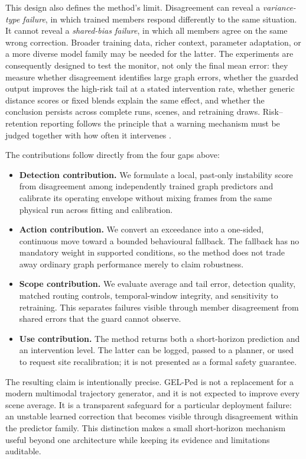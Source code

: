 This design also defines the method's limit. Disagreement can reveal a \emph{variance-type failure}, in which trained members respond differently to the same situation. It cannot reveal a \emph{shared-bias failure}, in which all members agree on the same wrong correction. Broader training data, richer context, parameter adaptation, or a more diverse model family may be needed for the latter. The experiments are consequently designed to test the monitor, not only the final mean error: they measure whether disagreement identifies large graph errors, whether the guarded output improves the high-risk tail at a stated intervention rate, whether generic distance scores or fixed blends explain the same effect, and whether the conclusion persists across complete runs, scenes, and retraining draws. Risk--retention reporting follows the principle that a warning mechanism must be judged together with how often it intervenes \citep{malinin2021shifts}.

The contributions follow directly from the four gaps above:

\begin{itemize}
    \item \textbf{Detection contribution.} We formulate a local, past-only instability score from disagreement among independently trained graph predictors and calibrate its operating envelope without mixing frames from the same physical run across fitting and calibration.
    \item \textbf{Action contribution.} We convert an exceedance into a one-sided, continuous move toward a bounded behavioural fallback. The fallback has no mandatory weight in supported conditions, so the method does not trade away ordinary graph performance merely to claim robustness.
    \item \textbf{Scope contribution.} We evaluate average and tail error, detection quality, matched routing controls, temporal-window integrity, and sensitivity to retraining. This separates failures visible through member disagreement from shared errors that the guard cannot observe.
    \item \textbf{Use contribution.} The method returns both a short-horizon prediction and an intervention level. The latter can be logged, passed to a planner, or used to request site recalibration; it is not presented as a formal safety guarantee.
\end{itemize}

The resulting claim is intentionally precise. GEL-Ped is not a replacement for a modern multimodal trajectory generator, and it is not expected to improve every scene average. It is a transparent safeguard for a particular deployment failure: an unstable learned correction that becomes visible through disagreement within the predictor family. This distinction makes a small short-horizon mechanism useful beyond one architecture while keeping its evidence and limitations auditable.

